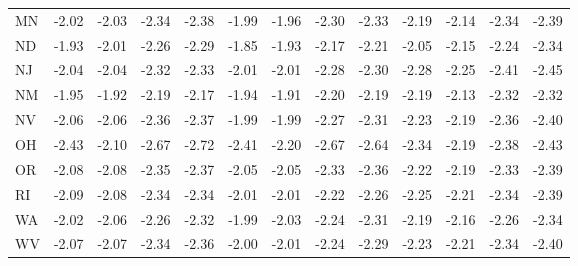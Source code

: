 \begin{landscape}
\begin{table}[H]
\begin{longtable}{lrrrr|rrrr|rrrr}
MN & -2.02 & -2.03 & -2.34 & -2.38 & -1.99 & -1.96 & -2.30 & -2.33 & -2.19 & -2.14 & -2.34 & -2.39 \\ 
ND & -1.93 & -2.01 & -2.26 & -2.29 & -1.85 & -1.93 & -2.17 & -2.21 & -2.05 & -2.15 & -2.24 & -2.34 \\ 
NJ & -2.04 & -2.04 & -2.32 & -2.33 & -2.01 & -2.01 & -2.28 & -2.30 & -2.28 & -2.25 & -2.41 & -2.45 \\ 
NM & -1.95 & -1.92 & -2.19 & -2.17 & -1.94 & -1.91 & -2.20 & -2.19 & -2.19 & -2.13 & -2.32 & -2.32 \\ 
NV & -2.06 & -2.06 & -2.36 & -2.37 & -1.99 & -1.99 & -2.27 & -2.31 & -2.23 & -2.19 & -2.36 & -2.40 \\ 
OH & -2.43 & -2.10 & -2.67 & -2.72 & -2.41 & -2.20 & -2.67 & -2.64 & -2.34 & -2.19 & -2.38 & -2.43 \\ 
OR & -2.08 & -2.08 & -2.35 & -2.37 & -2.05 & -2.05 & -2.33 & -2.36 & -2.22 & -2.19 & -2.33 & -2.39 \\ 
RI & -2.09 & -2.08 & -2.34 & -2.34 & -2.01 & -2.01 & -2.22 & -2.26 & -2.25 & -2.21 & -2.34 & -2.39 \\ 
WA & -2.02 & -2.06 & -2.26 & -2.32 & -1.99 & -2.03 & -2.24 & -2.31 & -2.19 & -2.16 & -2.26 & -2.34 \\ 
WV & -2.07 & -2.07 & -2.34 & -2.36 & -2.00 & -2.01 & -2.24 & -2.29 & -2.23 & -2.21 & -2.34 & -2.40 \\ 
 \hline
\end{longtable}
\end{table}


\end{landscape}
